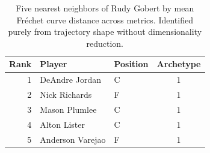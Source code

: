 \begin{table}[htbp]
  \centering\small
  \begin{tabular}{rllc}
    \toprule
    Rank & Player & Position & Archetype \\
    \midrule
    1 & DeAndre Jordan & C & 1 \\
    2 & Nick Richards & F & 1 \\
    3 & Mason Plumlee & C & 1 \\
    4 & Alton Lister & C & 1 \\
    5 & Anderson Varejao & F & 1 \\
    \bottomrule
  \end{tabular}
  \caption{Five nearest neighbors of Rudy Gobert by mean Fr\'{e}chet curve distance across metrics. Identified purely from trajectory shape without dimensionality reduction.}
  \label{tab:Rudy_Gobert_frechet_curve_neighbors}
\end{table}


